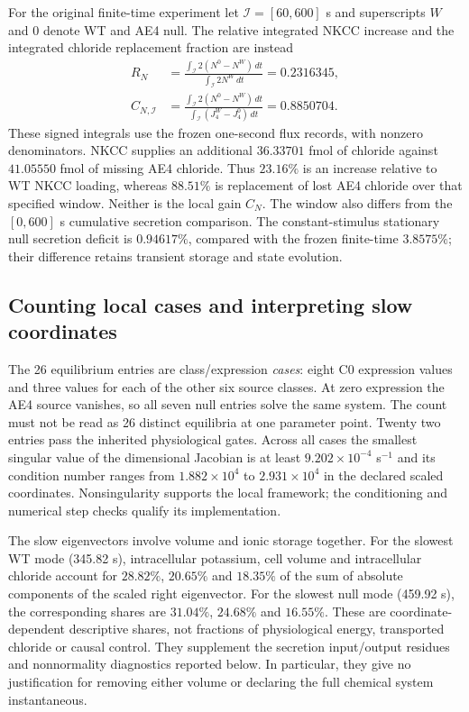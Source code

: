 For the original finite-time experiment let $\mathcal I=[60,600]$ s and
superscripts $W$ and $0$ denote WT and AE4 null. The relative integrated
NKCC increase and the integrated chloride replacement fraction are instead
\begin{align*}
 R_N&=\frac{\int_{\mathcal I}2(N^0-N^W)\,dt}
             {\int_{\mathcal I}2N^W\,dt}=0.2316345,\\
 C_{N,\mathcal I}&=
 \frac{\int_{\mathcal I}2(N^0-N^W)\,dt}
      {\int_{\mathcal I}(J_4^W-J_4^0)\,dt}=0.8850704.
\end{align*}
These signed integrals use the frozen one-second flux records, with nonzero
denominators. NKCC supplies an additional $36.33701$ fmol of chloride
against $41.05550$ fmol of missing AE4 chloride. Thus $23.16\%$ is an
increase relative to WT NKCC loading, whereas $88.51\%$ is replacement of
lost AE4 chloride over that specified window. Neither is the local gain
$C_N$. The window also differs from the $[0,600]$ s cumulative secretion
comparison. The constant-stimulus stationary null secretion deficit is
$0.94617\%$, compared with the frozen finite-time $3.8575\%$; their
difference retains transient storage and state evolution.

\subsection{Counting local cases and interpreting slow coordinates}
The 26 equilibrium entries are class/expression \emph{cases}: eight C0
expression values and three values for each of the other six source classes.
At zero expression the AE4 source vanishes, so all seven null entries solve
the same system. The count must not be read as 26 distinct equilibria at one
parameter point. Twenty two entries pass the inherited physiological gates.
Across all cases the smallest singular value of the dimensional Jacobian is
at least $9.202\times10^{-4}$ s$^{-1}$ and its condition number ranges from
$1.882\times10^4$ to $2.931\times10^4$ in the declared scaled coordinates.
Nonsingularity supports the local framework; the conditioning and numerical
step checks qualify its implementation.

The slow eigenvectors involve volume and ionic storage together. For the
slowest WT mode (345.82 s), intracellular potassium, cell volume and
intracellular chloride account for $28.82\%$, $20.65\%$ and $18.35\%$ of
the sum of absolute components of the scaled right eigenvector. For the
slowest null mode (459.92 s), the corresponding shares are $31.04\%$,
$24.68\%$ and $16.55\%$. These are coordinate-dependent descriptive shares,
not fractions of physiological energy, transported chloride or causal
control. They supplement the secretion input/output residues and
nonnormality diagnostics reported below. In particular, they give no
justification for removing either volume or declaring the full chemical
system instantaneous.
